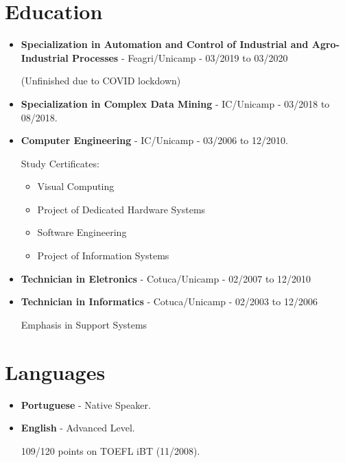 \documentclass[a4paper,10pt]{article}
\begin{document}
  \section{Education}
    \begin{itemize}
      \item
        \textbf{Specialization in Automation and Control of Industrial and Agro-Industrial Processes} - Feagri/Unicamp - 03/2019 to 03/2020

        (Unfinished due to COVID lockdown)

      \item
        \textbf{Specialization in Complex Data Mining} - IC/Unicamp - 03/2018 to 08/2018.

      \item  
        \textbf{Computer Engineering} - IC/Unicamp - 03/2006 to 12/2010.


        Study Certificates:
        \begin{itemize}
          \item Visual Computing
          \item Project of Dedicated Hardware Systems
          \item Software Engineering
          \item Project of Information Systems
        \end{itemize}


      \item  
        \textbf{Technician in Eletronics} - Cotuca/Unicamp - 02/2007 to 12/2010


      \item  
        \textbf{Technician in Informatics} - Cotuca/Unicamp - 02/2003 to 12/2006

        Emphasis in Support Systems


    \end{itemize}



  \section{Languages}
    \begin{itemize}

      \item
        \textbf{Portuguese} - Native Speaker.

      \item
        \textbf{English} - Advanced Level.

        109/120 points on TOEFL iBT (11/2008).

    \end{itemize}
\end{document}
